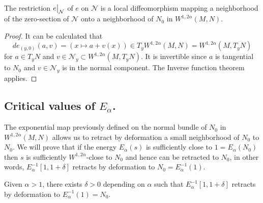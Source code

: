\begin{lemma}
\label{lem:local-isom-e}
The restriction \(\restr{e}{\mathcal{N}}\) of \(e\) on \(\mathcal{N}\) is a local
diffeomorphism mapping a neighborhood of the zero-section of \(\mathcal{N}\) onto a
neighborhood of \(N_0\) in \(W^{1,2\alpha}(M,N)\).
\end{lemma}
\begin{proof}
It can be calculated that 
\[
  de_{(y,0)}(a,v) = \left(x\mapsto a + v(x)\right) \in T_yW^{1,2\alpha}(M,N) =
W^{1,2\alpha}(M, T_yN)
\]
for \(a\in T_y N\) and \(v\in \mathcal{N}_y \subset W^{1,2\alpha}(M, T_y N)\). It
is invertible since \(a\) is tangential to \(N_0\) and \(v\in \mathcal{N}_y\) is
in the normal component. The Inverse function theorem applies.
\end{proof}

\subsection{Critical values of \(E_\alpha\).}
\label{sec:orgaed99f5}

The exponential map previously defined on the normal bundle of \(N_0\) in  \(W^{1,
2\alpha}(M,N)\) allows us to retract by deformation a small neighborhood of \(N_0\) to
\(N_0\). We will prove that if the energy \(E_\alpha(s)\) is sufficiently close to \(1=E_\alpha(N_0)\) then \(s\) is sufficiently \(W^{1,2\alpha}\)-close to \(N_0\) and hence can be retracted to \(N_0\), in other words, \(E_\alpha^{-1}[1, 1+\delta]\) retracts by deformation to \(N_0 = E_\alpha^{-1}(1)\).

\begin{proposition}[]
\label{prop:crit-val-1}
Given \(\alpha>1\), there exists \(\delta >0\) depending on \(\alpha\) such that \(E_\alpha^{-1}[1, 1+\delta]\) retracts by deformation to \(E_\alpha^{-1}(1) = N_0\).
\end{proposition}


